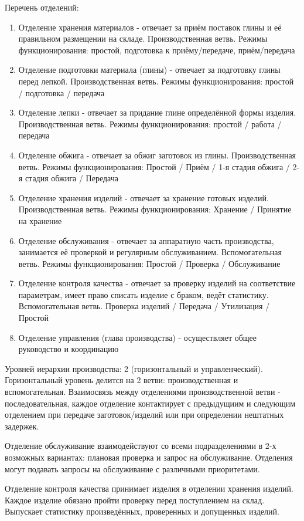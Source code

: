 \documentclass[16pt,a4paper]{article}
\begin{document}
Перечень отделений:
\begin{enumerate}
    \item Отделение хранения материалов - отвечает за приём поставок глины и её правильном размещении на складе. Производственная ветвь. Режимы функционирования: простой, подготовка к приёму/передаче, приём/передача
    \item Отделение подготовки материала (глины) - отвечает за подготовку глины перед лепкой. Производственная ветвь. Режимы функционирования: простой / подготовка / передача
    \item Отделение лепки - отвечает за придание глине определённой формы изделия. Производственная ветвь. Режимы функционирования: простой / работа / передача
    \item Отделение обжига - отвечает за обжиг заготовок из глины. Производственная ветвь. Режимы функционирования: Простой / Приём / 1-я стадия обжига / 2-я стадия обжига / Передача 
    \item Отделение хранения изделий - отвечает за хранение готовых изделий. Производственная ветвь. Режимы функционирования: Хранение / Принятие на хранение
    \item Отделение обслуживания - отвечает за аппаратную часть производства, занимается её проверкой и регулярным обслуживанием. Вспомогательная ветвь. Режимы функционирования: Простой / Проверка / Обслуживание
    \item Отделение контроля качества - отвечает за проверку изделий на соответствие параметрам, имеет право списать изделие с браком, ведёт статистику. Вспомогательная ветвь. Проверка изделий / Передача / Утилизация / Простой
    \item Отделение управления (глава производства) - осуществляет общее руководство и координацию
\end{enumerate}
 Уровней иерархии производства: 2 (горизонтальный и управленческий). Горизонтальный уровень делится на 2 ветви: производственная и вспомогательная.
Взаимосвязь между отделениями производственной ветви - последовательная, каждое отделение контактирует с предыдущиим и следующим отделением при передаче заготовок/изделий или при определении нештатных задержек. 

Отделение обслуживание взаимодействуют со всеми подразделениями в 2-х возможных вариантах: плановая проверка и запрос на обслуживание. Отделения могут подавать запросы на обслуживание с различными приоритетами.

Отделение контроля качества принимает изделия в отделении хранения изделий. Каждое изделие обязано пройти проверку перед поступлением на склад. Выпускает статистику произведённых, проверенных и допущенных изделий.
\end{document}
